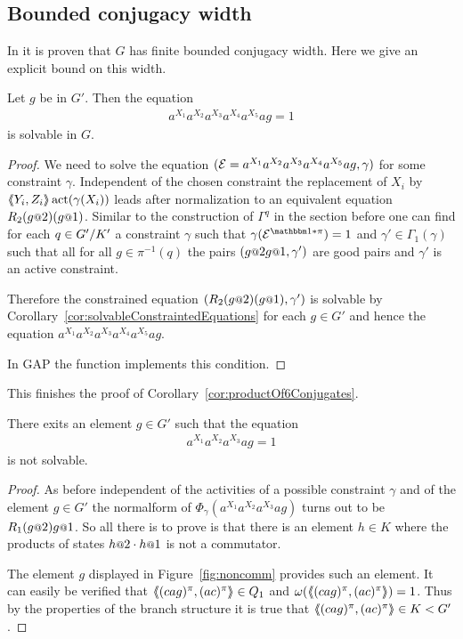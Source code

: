 \documentclass[a4paper,11pt]{amsart}
\begin{document}
\subsection{Bounded conjugacy width}
In \cite{Fink:Conjugacy_growth} it is proven that $G$ has finite bounded conjugacy width. Here we give an explicit bound 
on this width.
\begin{pro}
 Let $g$ be in $G'$. Then the equation 
 \begin{align*}
  a^{X_1}a^{X_2}a^{X_3}a^{X_4}a^{X_5}ag=1
 \end{align*}
is solvable in $G$. 
\end{pro}
\begin{proof}
We need to solve the equation $(\mathcal{E}=a^{X_1}a^{X_2}a^{X_3}a^{X_4}a^{X_5}ag,\gamma)$ for
some constraint $\gamma$. Independent of the chosen constraint the replacement of
$X_i$ by $\langle\negthickspace\langle Y_i,Z_i\rangle\negthickspace\rangle\operatorname{act}(\gamma(X_i))$ leads after normalization to an equivalent equation 
$R_2(g\at{2})(g\at{1})$. Similar to the construction of $\Gamma^q$ in the section
before one can find for each $q\in{G'/K'}$ a constraint $\gamma$ such that
$\gamma(\eq{E}^{\id*\pi})=1$ and $\gamma'\in\Gamma_1(\gamma)$ such that all for all 
$g\in\pi^{-1}(q)$ the pairs $(g\at{2}g\at{1},\gamma')$ are good pairs and $\gamma'$ is 
an active constraint.

Therefore the constrained equation $(R_2(g\at{2})(g\at{1}),\gamma')$ is solvable
by Corollary~\ref{cor:solvableConstraintedEquations}
for each $g\in G'$ and hence the equation $a^{X_1}a^{X_2}a^{X_3}a^{X_4}a^{X_5}ag$.

In GAP the function  implements 
this condition.
\end{proof}	
This finishes the proof of Corollary~\ref{cor:productOf6Conjugates}.
\begin{lem}
 There exits an element $g\in G'$ such that the equation 
 \begin{align*}
  a^{X_1}a^{X_2}a^{X_3}ag=1
 \end{align*}
 is not solvable.
\end{lem}
\begin{proof}
As before independent of the activities of a possible constraint $\gamma$ and of the element $g\in G'$
the normalform of $\Phi_\gamma(a^{X_1}a^{X_2}a^{X_3}ag)$ turns out to
be $R_1(g\at{2}) g\at{1}$. So all there is to prove is that there is an element $h\in K$
where the products of states $h\at{2}\cdot h\at{1}$ is not a commutator.

The element $g$ displayed in Figure~\ref{fig:noncomm} provides such an element. It can easily be verified 
that $\langle\negthickspace\langle(cag)^\pi,(ac)^\pi\rangle\negthickspace\rangle\in Q_1$ and $\omega(\langle\negthickspace\langle(cag)^\pi,(ac)^\pi\rangle\negthickspace\rangle)=1$. Thus by
the properties of the branch structure it is true that $\langle\negthickspace\langle(cag)^\pi,(ac)^\pi\rangle\negthickspace\rangle\in K<G'$. 
\end{proof}
\end{document}
